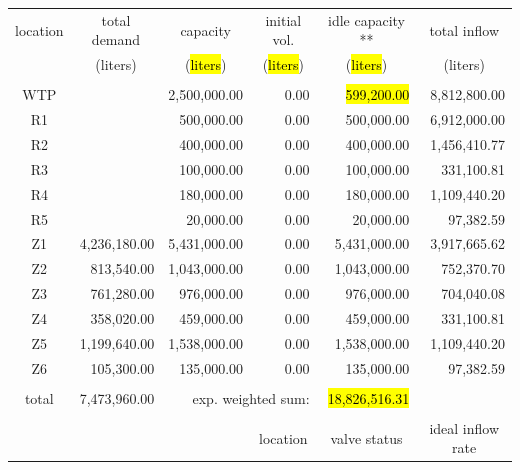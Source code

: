 \documentclass{singlecol}
\theoremstyle{TH}{
\newtheorem{lemma}{Lemma}
\newtheorem{theorem}[lemma]{Theorem}
\newtheorem{corrolary}[lemma]{Corrolary}
\newtheorem{conjecture}[lemma]{Conjecture}
\newtheorem{proposition}[lemma]{Proposition}
\newtheorem{claim}[lemma]{Claim}
\newtheorem{stheorem}[lemma]{Wrong Theorem}
\newtheorem{algorithm}{Algorithm}
}
\theoremstyle{THrm}{
\newtheorem{definition}{Definition}[section]
\newtheorem{question}{Question}[section]
\newtheorem{remark}{Remark}
\newtheorem{scheme}{Scheme}
}
\theoremstyle{THhit}{
\newtheorem{case}{Case}[section]
}
\begin{document}
\begin{table}[h!]
\begin{center}
\begin{small}
	\begin{tabular}{ c r r r r r } 
		location & \multicolumn{1}{c}{total demand}      & \multicolumn{1}{c}{capacity} & \multicolumn{1}{c}{initial vol.} & \multicolumn{1}{c}{idle capacity **} & \multicolumn{1}{c}{total inflow}  \\
		      & \multicolumn{1}{c}{(liters)} & \multicolumn{1}{c}{(\hl{liters})}   & \multicolumn{1}{c}{(\hl{liters})}     &  \multicolumn{1}{c}{(\hl{liters})}   &  \multicolumn{1}{c}{(liters)}               \\
		\\
		WTP   &              & 2,500,000.00 & 0.00 &  \hl{599,200.00} & 8,812,800.00 \\
		R1    &              &   500,000.00 & 0.00 &    500,000.00 & 6,912,000.00 \\
		R2    &              &   400,000.00 & 0.00 &    400,000.00 & 1,456,410.77 \\
		R3    &              &   100,000.00 & 0.00 &    100,000.00 &   331,100.81 \\
	    R4    &              &   180,000.00 & 0.00 &    180,000.00 & 1,109,440.20  \\
	    R5    &              &    20,000.00 & 0.00 &     20,000.00 &    97,382.59 \\
	    Z1    & 4,236,180.00 & 5,431,000.00 & 0.00 &  5,431,000.00 & 3,917,665.62 \\
	    Z2    &   813,540.00 & 1,043,000.00 & 0.00 &  1,043,000.00 &   752,370.70 \\
	    Z3    &   761,280.00 &   976,000.00 & 0.00 &    976,000.00 &   704,040.08 \\
	    Z4    &   358,020.00 &   459,000.00 & 0.00 &    459,000.00 &   331,100.81 \\
	    Z5    & 1,199,640.00 & 1,538,000.00 & 0.00 &  1,538,000.00 & 1,109,440.20 \\
	    Z6    &   105,300.00 &   135,000.00 & 0.00 &    135,000.00 &    97,382.59 \\
	    \\
	    total & 7,473,960.00 & \multicolumn{2}{r}{exp. weighted sum:} & \hl{18,826,516.31} &              \\
		   \\
		&  &      &  \multicolumn{1}{c}{location}    & \multicolumn{1}{c}{valve status} & \multicolumn{1}{c}{ideal inflow rate}   \\

\end{tabular}
\end{small}
\end{center}
\end{table}
\end{document}

